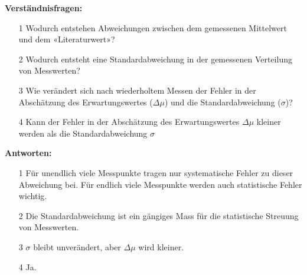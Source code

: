 \begin{tcolorbox}[enhanced,width=6in,
    fontupper=\small,drop fuzzy shadow southwest,
    colframe=black!50!black,colback=black!5]
\textbf{Verständnisfragen:} \\
\begin{enumerate}
\item[1] Wodurch entstehen Abweichungen zwischen dem
gemessenen Mittelwert und dem «Literaturwert»?
\item[2] Wodurch entsteht eine Standardabweichung in der
gemessenen Verteilung von Messwerten?
\item[3] Wie verändert sich nach wiederholtem Messen der Fehler in der
Abschätzung des Erwartungswertes ($\Delta\mu$) und die Standardabweichung ($\sigma$)?
\item[4] Kann der Fehler in der Abschätzung des Erwartungswertes $\Delta\mu$ kleiner werden als die Standardabweichung $\sigma$
\end{enumerate}
\end{tcolorbox}

\begin{tcolorbox}[enhanced,width=6in,
    fontupper=\small,drop fuzzy shadow southwest,
    colframe=black!50!black,colback=black!5]
\textbf{Antworten:} \\
\begin{enumerate}
\item[1] Für unendlich viele Messpunkte tragen nur
systematische Fehler zu dieser Abweichung bei. Für
endlich viele Messpunkte werden auch statistische
Fehler wichtig.
\item[2] Die Standardabweichung ist ein gängiges Mass für die
statistische Streuung von Messwerten.
\item[3] $\sigma$ bleibt unverändert, aber $\Delta \mu $ wird kleiner. 
\item[4] Ja.
\end{enumerate}
\end{tcolorbox}